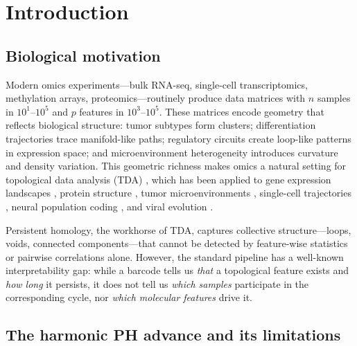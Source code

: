 \documentclass[12pt]{article}
\begin{document}
\section{Introduction}
\label{sec:introduction}

\subsection{Biological motivation}

Modern omics experiments---bulk RNA-seq, single-cell transcriptomics, methylation arrays, proteomics---routinely produce data matrices with $n$ samples in $10^1$--$10^5$ and $p$ features in $10^3$--$10^5$.
These matrices encode geometry that reflects biological structure:
tumor subtypes form clusters; differentiation trajectories trace manifold-like paths; regulatory circuits create loop-like patterns in expression space; and microenvironment heterogeneity introduces curvature and density variation.
This geometric richness makes omics a natural setting for topological data analysis (TDA) \cite{carlsson2009, edelsbrunner2010}, which has been applied to gene expression landscapes \cite{rizvi2017}, protein structure \cite{xia2014}, tumor microenvironments \cite{vipond2021}, single-cell trajectories \cite{moon2019phate}, neural population coding \cite{giusti2015}, and viral evolution \cite{chan2013topology}.

Persistent homology, the workhorse of TDA, captures collective structure---loops, voids, connected components---that cannot be detected by feature-wise statistics or pairwise correlations alone.
However, the standard pipeline has a well-known interpretability gap: while a barcode tells us \emph{that} a topological feature exists and \emph{how long} it persists, it does not tell us \emph{which samples} participate in the corresponding cycle, nor \emph{which molecular features} drive it.

\subsection{The harmonic PH advance and its limitations}
\end{document}
